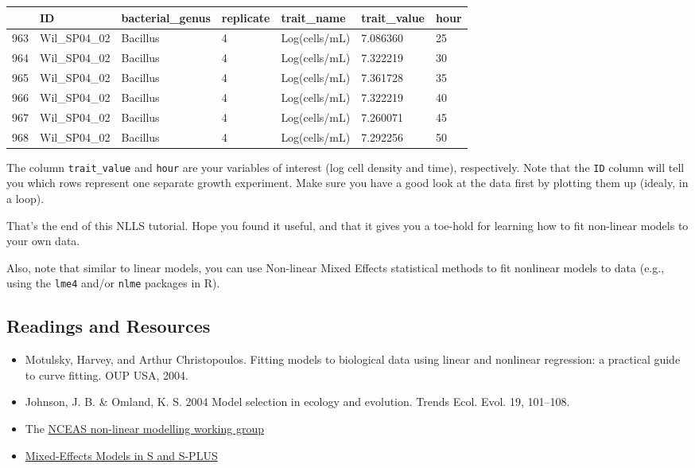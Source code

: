 \documentclass[11pt]{article}
\providecommand{\tightlist}{%
      \setlength{\itemsep}{0pt}\setlength{\parskip}{0pt}}
\begin{document}
    
    \begin{tabular}{r|llllll}
  & ID & bacterial\_genus & replicate & trait\_name & trait\_value & hour\\
\hline
	963 & Wil\_SP04\_02 & Bacillus        & 4               & Log(cells/mL)   & 7.086360        & 25             \\
	964 & Wil\_SP04\_02 & Bacillus        & 4               & Log(cells/mL)   & 7.322219        & 30             \\
	965 & Wil\_SP04\_02 & Bacillus        & 4               & Log(cells/mL)   & 7.361728        & 35             \\
	966 & Wil\_SP04\_02 & Bacillus        & 4               & Log(cells/mL)   & 7.322219        & 40             \\
	967 & Wil\_SP04\_02 & Bacillus        & 4               & Log(cells/mL)   & 7.260071        & 45             \\
	968 & Wil\_SP04\_02 & Bacillus        & 4               & Log(cells/mL)   & 7.292256        & 50             \\
\end{tabular}


    
    The column \texttt{trait\_value} and \texttt{hour} are your variables of
interest (log cell density and time), respectively. Note that the
\texttt{ID} column will tell you which rows represent one separate
growth experiment. Make sure you have a good look at the data first by
plotting them up (idealy, in a loop).

    That's the end of this NLLS tutorial. Hope you found it useful, and that
it gives you a toe-hold for learning how to fit non-linear models to
your own data.

Also, note that similar to linear models, you can use Non-linear Mixed
Effects statistical methods to fit nonlinear models to data (e.g., using
the \texttt{lme4} and/or \texttt{nlme} packages in R).

    \subsection{Readings and Resources }\label{readings-and-resources}

\begin{itemize}
\tightlist
\item
  Motulsky, Harvey, and Arthur Christopoulos. Fitting models to
  biological data using linear and nonlinear regression: a practical
  guide to curve fitting. OUP USA, 2004.
\item
  Johnson, J. B. \& Omland, K. S. 2004 Model selection in ecology and
  evolution. Trends Ecol. Evol. 19, 101--108.
\item
  The
  \href{https://groups.nceas.ucsb.edu/non-linear-modeling/projects/OrangeTree}{NCEAS
  non-linear modelling working group}
\item
  \href{https://link.springer.com/book/10.1007/b98882}{Mixed-Effects
  Models in S and S-PLUS}
\end{itemize}


    
    
    
    
\end{document}
